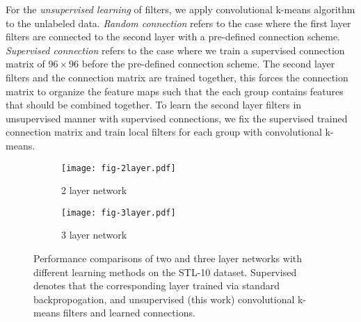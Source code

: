 \documentclass{article} \usepackage{iclr2016_workshop,times}
\begin{document}
For the \textit{unsupervised learning} of filters, we apply convolutional k-means algorithm to the unlabeled data.
\textit{Random connection} refers to the case where the first layer filters are connected to the second layer with a pre-defined connection scheme.
\textit{Supervised connection} refers to the case where  we train a supervised connection matrix of $96\times96$ before the pre-defined connection scheme. 
The second layer filters and the connection matrix are trained together, this forces the connection matrix to organize the feature maps such that the each group contains features that should be combined together.
To learn the second layer filters in unsupervised manner with supervised connections, we fix the supervised trained connection matrix and train local filters for each group with convolutional k-means.




\begin{figure*} \centering
  \begin{subfigure}[b]{0.5\textwidth}
    \centering
    \texttt{[image: fig-2layer.pdf]}
    \caption{ 2 layer network}
    \label{fig:2layer}
  \end{subfigure}\begin{subfigure}[b]{0.5\textwidth}
      \centering
    \texttt{[image: fig-3layer.pdf]}
    \caption{3 layer network}
    \label{fig:3layer}
  \end{subfigure}
  \caption{
    Performance comparisons of two and three layer networks with different learning methods on the STL-10 dataset.
    Supervised denotes that the corresponding layer trained via standard backpropogation, and unsupervised (this work) convolutional k-means filters and learned connections.
  }
  \label{fig:networks}
\end{figure*}
\end{document}
